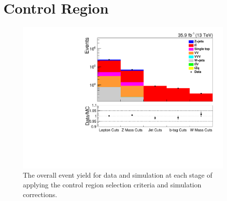 \clearpage
\newpage

\section{\ttbar Control Region}\label{appSec:ttbarControlRegionPlots}

\begin{figure}[ht]
\centering
\includegraphics[width=0.97\textwidth]{figs/background-estimation/plots/unblinded/ttbar_control/cutFlow_log.pdf}
\caption{
The overall event yield for data and simulation at each stage of applying the \ttbar control region selection criteria and simulation corrections.
}
\label{fig:ttbar_cutFlow}
\end{figure}


